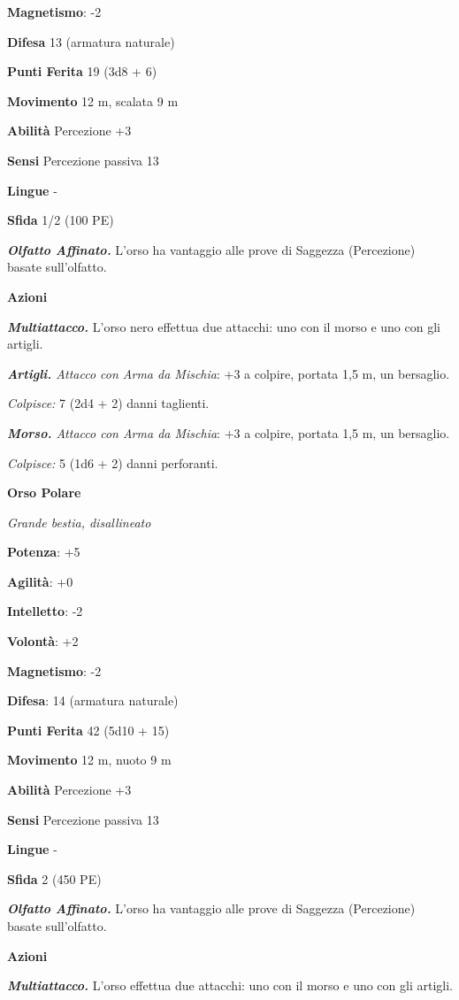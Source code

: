 \begin{multicols}{2}
\textbf{Magnetismo}: -2

\textbf{Difesa} 13 (armatura naturale)

\textbf{Punti Ferita} 19 (3d8 + 6)

\textbf{Movimento} 12 m, scalata 9 m

\textbf{Abilità} Percezione +3

\textbf{Sensi} Percezione passiva 13

\textbf{Lingue} -

\textbf{Sfida} 1/2 (100 PE)

\emph{\textbf{Olfatto Affinato.}} L'orso ha vantaggio alle prove di
Saggezza (Percezione) basate sull'olfatto.

\textbf{Azioni}

\emph{\textbf{Multiattacco.}} L'orso nero effettua due attacchi: uno con
il morso e uno con gli artigli.

\emph{\textbf{Artigli.} Attacco con Arma da Mischia}: +3 a colpire,
portata 1,5 m, un bersaglio.

\emph{Colpisce:} 7 (2d4 + 2) danni taglienti.

\emph{\textbf{Morso.} Attacco con Arma da Mischia}: +3 a colpire,
portata 1,5 m, un bersaglio.

\emph{Colpisce:} 5 (1d6 + 2) danni perforanti.

\textbf{Orso Polare}

\emph{Grande bestia, disallineato}

\textbf{Potenza}: +5

\textbf{Agilità}: +0

\textbf{Intelletto}: -2

\textbf{Volontà}: +2

\textbf{Magnetismo}: -2

\textbf{Difesa}: 14 (armatura naturale)

\textbf{Punti Ferita} 42 (5d10 + 15)

\textbf{Movimento} 12 m, nuoto 9 m

\textbf{Abilità} Percezione +3

\textbf{Sensi} Percezione passiva 13

\textbf{Lingue} -

\textbf{Sfida} 2 (450 PE)

\emph{\textbf{Olfatto Affinato.}} L'orso ha vantaggio alle prove di
Saggezza (Percezione) basate sull'olfatto.

\textbf{Azioni}

\emph{\textbf{Multiattacco.}} L'orso effettua due attacchi: uno con il
morso e uno con gli artigli.


\end{multicols}
